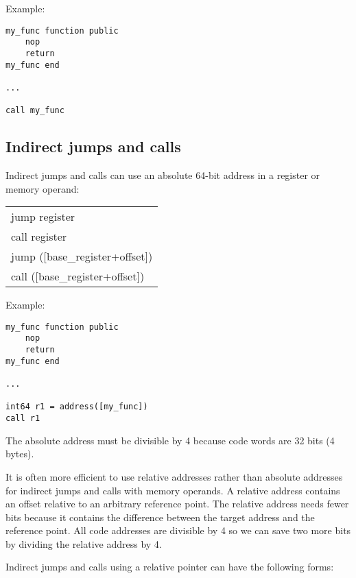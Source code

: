 \documentclass[forwardcom.tex]{subfiles}
\begin{document}
Example:
\begin{lstlisting}[frame=single]
my_func function public
    nop
    return
my_func end

...

call my_func
\end{lstlisting}
\vspace{4mm}


\subsection{Indirect jumps and calls} 
Indirect jumps and calls can use an absolute 64-bit address in 
a register or memory operand:

\begin{tabular}{|p{140mm}|}
\hline
\hspace{4mm} jump register\\
\hspace{4mm} call register\\
\hspace{4mm} jump ([base\_register+offset])\\
\hspace{4mm} call ([base\_register+offset])\\
\hline
\end{tabular}
\vv

Example:
\begin{lstlisting}[frame=single]
my_func function public
    nop
    return
my_func end

...

int64 r1 = address([my_func])
call r1
\end{lstlisting}
\vv

The absolute address must be divisible by 4 because code words are 32 bits (4 bytes).
\vspace{4mm}

It is often more efficient to use relative addresses rather than absolute addresses for indirect jumps and calls with memory operands. A relative address contains an offset relative to an arbitrary reference point. The relative address needs fewer bits because it contains the difference between the target address and the reference point. All code addresses are divisible by 4 so we can save two more bits by dividing the relative address by 4.
\vv

Indirect jumps and calls using a relative pointer can have the following forms:
\end{document}
